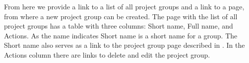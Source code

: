 From here we provide a link to a list of all project groups and a link to a page, from where a new project group can be created.
The page with the list of all project groups has a table with three columns: Short name, Full name, and Actions.
As the name indicates Short name is a short name for a group. 
The Short name also serves as a link to the project group page described in .
In the Actions column there are links to delete and edit the project group.
